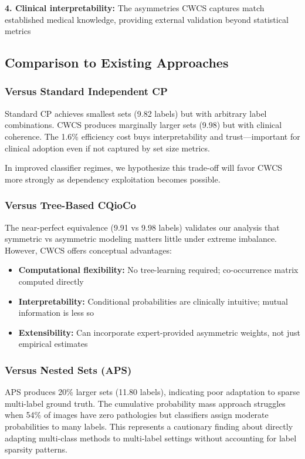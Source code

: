 \textbf{4. Clinical interpretability:} The asymmetries CWCS captures match established medical knowledge, providing external validation beyond statistical metrics

\subsection{Comparison to Existing Approaches}

\subsubsection{Versus Standard Independent CP}

Standard CP achieves smallest sets (9.82 labels) but with arbitrary label combinations. CWCS produces marginally larger sets (9.98) but with clinical coherence. The 1.6\% efficiency cost buys interpretability and trust---important for clinical adoption even if not captured by set size metrics.

In improved classifier regimes, we hypothesize this trade-off will favor CWCS more strongly as dependency exploitation becomes possible.

\subsubsection{Versus Tree-Based CQioCo}

The near-perfect equivalence (9.91 vs 9.98 labels) validates our analysis that symmetric vs asymmetric modeling matters little under extreme imbalance. However, CWCS offers conceptual advantages:

\begin{itemize}
    \item \textbf{Computational flexibility:} No tree-learning required; co-occurrence matrix computed directly
    \item \textbf{Interpretability:} Conditional probabilities are clinically intuitive; mutual information is less so
    \item \textbf{Extensibility:} Can incorporate expert-provided asymmetric weights, not just empirical estimates
\end{itemize}

\subsubsection{Versus Nested Sets (APS)}

APS produces 20\% larger sets (11.80 labels), indicating poor adaptation to sparse multi-label ground truth. The cumulative probability mass approach struggles when 54\% of images have zero pathologies but classifiers assign moderate probabilities to many labels. This represents a cautionary finding about directly adapting multi-class methods to multi-label settings without accounting for label sparsity patterns.

